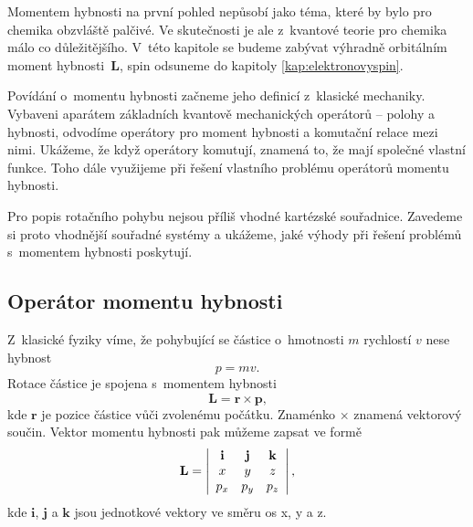 
Momentem hybnosti na první pohled nepůsobí jako téma, které by bylo pro chemika obzvláště palčivé. Ve skutečnosti je ale z~kvantové teorie pro chemika málo co důležitějšího. V~této kapitole se budeme zabývat výhradně orbitálním moment hybnosti~$\mathbf{L}$, spin  odsuneme do kapitoly \ref{kap:elektronovyspin}.  

Povídání o~momentu hybnosti začneme jeho definicí z~klasické mechaniky. Vybaveni aparátem základních kvantově mechanických operátorů -- polohy a hybnosti, odvodíme operátory pro moment hybnosti a komutační relace mezi nimi. Ukážeme, že když operátory komutují, znamená to, že mají společné vlastní funkce. Toho dále využijeme při řešení vlastního problému operátorů momentu hybnosti.

Pro popis rotačního pohybu nejsou příliš vhodné kartézské souřadnice. Zavedeme si proto vhodnější souřadné systémy a ukážeme, jaké výhody při řešení problémů s~momentem hybnosti poskytují. 

\subsection{Operátor momentu hybnosti}
\label{kap:OperatorMomentuHybnosti}

Z~klasické fyziky víme, že pohybující se částice o~hmotnosti $m$ rychlostí $v$ nese hybnost
\begin{equation}
p = mv \mbox{.}
\label{rov:Hybnost1}
\end{equation}
Rotace částice je spojena s~momentem hybnosti
\begin{equation}
\mathbf{L} = \mathbf{r} \times \mathbf{p} \mbox{,}
\label{rov:Hybnost2}
\end{equation}
kde $\mathbf{r}$ je pozice částice vůči zvolenému počátku. Znaménko $\times$ znamená vektorový součin. Vektor momentu hybnosti pak můžeme zapsat ve formě
\begin{equation}
\mathbf{L} = \left\vert
\begin{array}[c]{ccc}
\mathbf{i}&\mathbf{j}&\mathbf{k}\\
x&y&z\\
p_x&p_y&p_z\\
\end{array} \right\vert
\mbox{,}
\label{rov:Hybnost3}
\end{equation}
kde $\mathbf{i}$, $\mathbf{j}$ a $\mathbf{k}$ jsou jednotkové vektory ve směru os x, y a z. 

